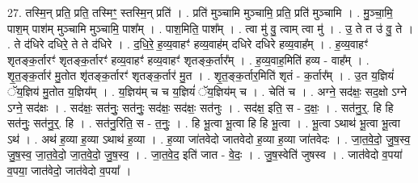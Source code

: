 \documentclass[17pt]{extarticle}
\begin{document}
27. तस्मि॒न् प्रति॒ प्रति॒ तस्मिꣳ॒॒ स्तस्मि॒न् प्रति॑ । . प्रति॑ मुञ्चामि मुञ्चामि॒ प्रति॒ प्रति॑ मुञ्चामि । . मु॒ञ्चा॒मि॒ पाश॒म् पाश॑म् मुञ्चामि मुञ्चामि॒ पाश᳚म् । . पाश॒मिति॒ पाश᳚म् । . त्वा मु॑ वु॒ त्वाम् त्वा मु॑ । . उ॒ ते त उ॑ वु॒ ते । . ते द॑धिरे दधिरे॒ ते ते द॑धिरे । . द॒धि॒रे॒ ह॒व्य॒वाहꣳ॑ हव्य॒वाह॑म् दधिरे दधिरे हव्य॒वाह᳚म् । . ह॒व्य॒वाहꣳ॑ शृतङ्क॒र्तारꣳ॑ शृतङ्क॒र्तारꣳ॑ हव्य॒वाहꣳ॑ हव्य॒वाहꣳ॑ शृतङ्क॒र्तार᳚म् । . ह॒व्य॒वाह॒मिति॑ हव्य - वाह᳚म् । . शृ॒त॒ङ्क॒र्तार॑ मु॒तोत शृ॑तङ्क॒र्तारꣳ॑ शृतङ्क॒र्तार॑ मु॒त । . शृ॒त॒ङ्क॒र्तार॒मिति॑ शृतं - क॒र्तार᳚म् । . उ॒त य॒ज्ञियं॑ ॅय॒ज्ञिय॑ मु॒तोत य॒ज्ञिय᳚म् । . य॒ज्ञिय॑म् च च य॒ज्ञियं॑ ॅय॒ज्ञिय॑म् च । . चेति॑ च । . अग्ने॒ सद॑क्षः॒ सद॒क्षो ऽग्ने ऽग्ने॒ सद॑क्षः । . सद॑क्षः॒ सत॑नुः॒ सत॑नुः॒ सद॑क्षः॒ सद॑क्षः॒ सत॑नुः । . सद॑क्ष॒ इति॒ स - द॒क्षः॒ । . सत॑नु॒र्॒. हि हि सत॑नुः॒ सत॑नु॒र्॒. हि । . सत॑नु॒रिति॒ स - त॒नुः॒ । . हि भू॒त्वा भू॒त्वा हि हि भू॒त्वा । . भू॒त्वा ऽथाथ॑ भू॒त्वा भू॒त्वा ऽथ॑ । . अथ॑ ह॒व्या ह॒व्या ऽथाथ॑ ह॒व्या । . ह॒व्या जा॑तवेदो जातवेदो ह॒व्या ह॒व्या जा॑तवेदः । . जा॒त॒वे॒दो॒ जु॒ष॒स्व॒ जु॒ष॒स्व॒ जा॒त॒वे॒दो॒ जा॒त॒वे॒दो॒ जु॒ष॒स्व॒ । . जा॒त॒वे॒द॒ इति॑ जात - वे॒दः॒ । . जु॒ष॒स्वेति॑ जुषस्व । . जात॑वेदो व॒पया॑ व॒पया॒ जात॑वेदो॒ जात॑वेदो व॒पया᳚ । \newline
\end{document}

